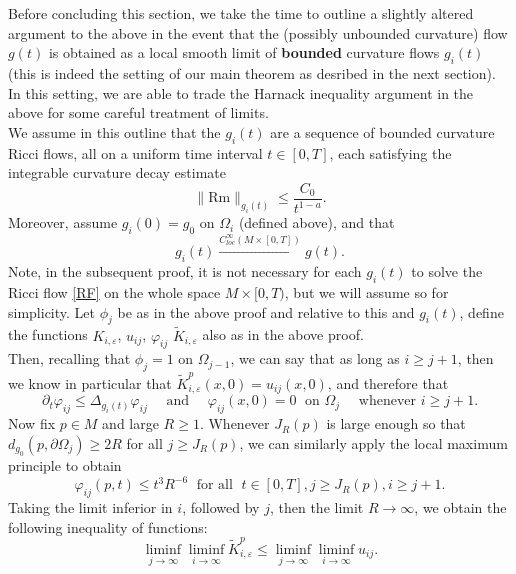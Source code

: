 \documentclass{amsart}
\theoremstyle{definition}
\newcommand{\Rm}{\mathrm{Rm}}
\begin{document}
Before concluding this section, we take the time to outline a slightly altered argument to the above in the event that the (possibly unbounded curvature) flow $g(t)$ is obtained as a local smooth limit of \textbf{bounded} curvature flows $g_i(t)$ (this is indeed the setting of our main theorem as desribed in the next section). In this setting, we are able to trade the Harnack inequality argument in the above for some careful treatment of limits. \\

We assume in this outline that the $g_i(t)$ are a sequence of bounded curvature Ricci flows, all on a uniform time interval $t\in [0,T]$, each satisfying the integrable curvature decay estimate 
\[
\|\Rm\|_{g_i(t)}\leq \frac{C_0}{t^{1-a}}.
\]
Moreover, assume $g_i(0)=g_0$ on $\Omega_i$ (defined above), and that 
\[
g_i(t) \xrightarrow{C^\infty_{loc}(M\times [0,T])} g(t).
\]
Note, in the subsequent proof, it is not necessary for each $g_i(t)$ to solve the Ricci flow \eqref{RF} on the whole space $M\times[0, T)$, but we will assume so for simplicity. Let $\phi_j$ be as in the above proof and relative to this and $g_i(t)$, define the functions $K_{i,\varepsilon}$, $u_{ij}$, $\varphi_{ij}$ $\widetilde K_{i,\varepsilon}$ also as in the above proof. \\

Then, recalling that $\phi_j=1$ on $\Omega_{j-1}$, we can say that as long as $i\geq j+1$, then we know in particular that $\widetilde K_{i,\varepsilon}^p(x,0)=u_{ij}(x,0)$, and therefore that
\begin{equation}\label{heatphiIJ} \partial_t  \varphi_{ij}\leq \Delta_{g_i(t)} \varphi_{ij}\quad \text{ and } \quad  \varphi_{ij}(x, 0)=0\;\text{ on }\Omega_j \quad  \text{ whenever } i\geq j+1.
\end{equation} 
Now fix  $p\in M$ and large $R\geq 1$. Whenever $J_R(p)$ is large enough so that $d_{g_0}(p,\partial \Omega_j)\geq 2R$ for all $j\geq J_R(p)$, we can similarly apply the local maximum principle {\cite[Theorem 1.1]{LeeTam}} to obtain
\begin{equation}
\varphi_{ij}(p,t)\leq t^3R^{-6} \; \text{ for all }\; t\in [0,T], j\geq J_R(p), i\geq j+1.
\end{equation}
Taking the limit inferior in $i$, followed by $j$, then the limit $R\to \infty$, we obtain the following inequality of functions:
\[
\liminf_{j\to \infty}\liminf_{i\to \infty}\widetilde K_{i,\varepsilon}^p\leq \liminf_{j\to \infty}\liminf_{i\to \infty} u_{ij}.
\]
\end{document}
